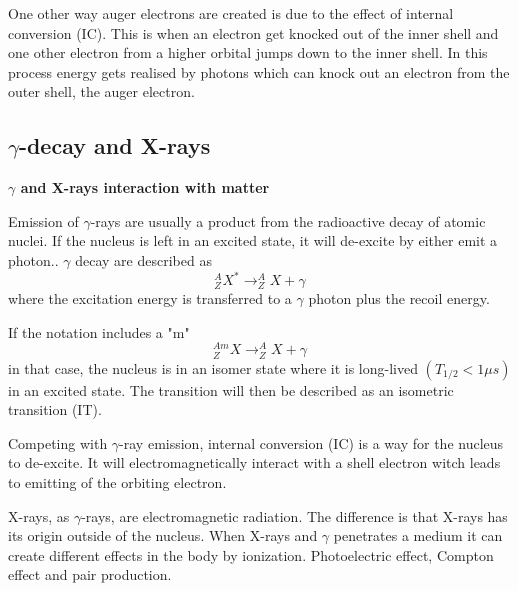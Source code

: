 \documentclass[twoside,english]{uiofysmaster/uiofysmaster}
\begin{document}
One other way auger electrons are created is due to the effect of internal conversion (IC). This is when an electron get knocked out of the inner shell and one other electron from a higher orbital jumps down to the inner shell. In this process energy gets realised by photons which can knock out an electron from the outer shell, the auger electron. 




\subsection{$\gamma$-decay and X-rays}

\textbf{$\gamma$ and X-rays interaction with matter}

\noindent
Emission of $\gamma$-rays are usually a product from the radioactive decay of atomic nuclei. If the nucleus is left in an excited state, it will de-excite by either emit a photon.\cite{nuclearchem}. $\gamma$ decay are described as \begin{equation}
^{A}_{Z}X^* \rightarrow ^{A}_ZX + \gamma 
\end{equation}
where the excitation energy is transferred to a $\gamma$ photon plus the recoil energy.

If the notation includes a "m" \begin{equation}
^{Am}_ZX \rightarrow ^{A}_ZX + \gamma
\end{equation}
in that case, the nucleus is in an isomer state where it is long-lived $(T_{1/2} < 1 \mu s)$ in an excited state\cite{nuclearchem}. The transition will then be described as an isometric transition (IT).

Competing with $\gamma$-ray emission, internal conversion (IC) is a way for the nucleus to de-excite. It will electromagnetically interact with a shell electron witch leads to emitting of the orbiting electron\cite{toxicology}.

  
X-rays, as $\gamma$-rays, are electromagnetic radiation. The difference is that X-rays has its origin outside of the nucleus. When X-rays and $\gamma$ penetrates a medium it can create different effects in the body by ionization.
Photoelectric effect, Compton effect and pair production. 
\end{document}

